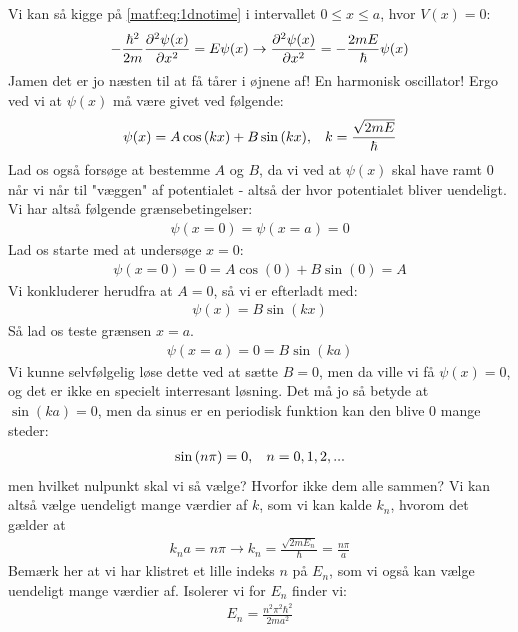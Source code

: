 \documentclass[crop=false, class=memoir]{standalone}
\begin{document}
Vi kan så kigge på \cref{matf:eq:1dnotime} i intervallet $0\leq x \leq a$, hvor $V(x) = 0$:
\begin{align}
    -\frac{\hbar^2}{2m}\pdv[2]{\psi(x)}{x} = E\psi(x) \rightarrow \pdv[2]{\psi(x)}{x} = -\frac{2mE}{\hbar}\psi(x)
\end{align}
Jamen det er jo næsten til at få tårer i øjnene af! En harmonisk oscillator! Ergo ved vi at $\psi(x)$ må være givet ved følgende:
\begin{align}
    \psi(x) = A\cos{(kx)} + B\sin{(kx)}, \hspace{3mm} k = \frac{\sqrt{2mE}}{\hbar}
\end{align}
Lad os også forsøge at bestemme $A$ og $B$, da vi ved at $\psi(x)$ skal have ramt $0$ når vi når til "væggen" af potentialet - altså der hvor potentialet bliver uendeligt. Vi har altså følgende grænsebetingelser:
\begin{align}
    \psi(x = 0) = \psi(x = a) = 0
\end{align}
Lad os starte med at undersøge $x = 0$:
\begin{align}
    \psi(x=0) = 0 = A\cos{(0)} + B \sin{(0)} = A
\end{align}
Vi konkluderer herudfra at $A = 0$, så vi er efterladt med:
\begin{align}
    \psi(x) = B\sin{(kx)}
    \label{matf:eq:inftpotsol}
\end{align}
Så lad os teste grænsen $x = a$.
\begin{align}
    \psi(x = a) = 0 = B\sin{(ka)}
\end{align}
Vi kunne selvfølgelig løse dette ved at sætte $B = 0$, men da ville vi få $\psi(x) = 0$, og det er ikke en specielt interresant løsning. Det må jo så betyde at $\sin{(ka)} = 0$, men da sinus er en periodisk funktion kan den blive $0$ mange steder:
\begin{align}
    \sin{(n\pi)} = 0, \hspace{3mm} n = 0, 1, 2, ...
\end{align}
men hvilket nulpunkt skal vi så vælge? Hvorfor ikke dem alle sammen? Vi kan altså vælge uendeligt mange værdier af $k$, som vi kan kalde $k_n$, hvorom det gælder at
\begin{align}
    k_n a = n \pi \rightarrow k_n = \frac{\sqrt{2mE_n}}{\hbar} = \frac{n\pi}{a}
\end{align}
Bemærk her at vi har klistret et lille indeks $n$ på $E_n$, som vi også kan vælge uendeligt mange værdier af. Isolerer vi for $E_n$ finder vi:
\begin{align}
    E_n = \frac{n^2 \pi^2 \hbar^2}{2ma^2}
\end{align}
\end{document}
